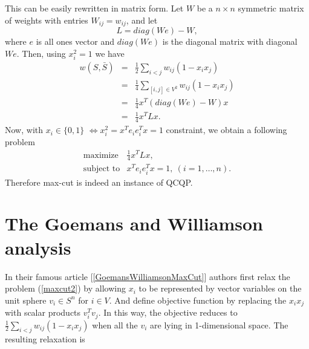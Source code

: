 \documentclass[12pt]{book}
\theoremstyle{definition}
\begin{document}
This can be easily rewritten in matrix form. Let $W$ be a $n\times n$ symmetric matrix of weights with entries $W_{ij} = w_{ij}$, and let
\begin{equation}
\label{LaplacianMatrix}
L = diag(We) - W,
\end{equation}
 where $e$ is all ones vector and $diag(We)$ is the diagonal matrix with diagonal $We$.
Then, using $x_i^2 = 1$ we have
\begin{eqnarray}
w(S,\bar{S}) & = & \frac{1}{2}\sum_{i<j}w_{ij}(1-x_ix_j )  \\
			 & = & \frac{1}{4}\sum_{[i,j]\in V^2}w_{ij}(1-x_ix_j ) \\
			 & = & \frac{1}{4}x^T(diag(We) - W)x  \\
			 & = & \frac{1}{4}x^TLx.
\end{eqnarray}
Now, with $x_i \in \{0,1\}$ $\Leftrightarrow x_i^2 = x^Te_ie_i^Tx = 1$ constraint, we obtain a following problem
\begin{equation}
\label{maxcut3}
\begin{array}{ll}
\mbox{maximize} & \frac{1}{4}x^TLx, \\
\mbox{subject to} &  x^Te_ie_i^Tx = 1, \  (i = 1,\dots ,n).
\end{array}
\end{equation}
Therefore max-cut is indeed an instance of QCQP.


\section{The Goemans and Williamson analysis}
\label{SectionGoemansAndWIlliamson}

In their famous article [\ref{GoemansWilliamsonMaxCut}] authors first relax the problem (\ref{maxcut2})
by allowing $x_i$ to be represented by vector variables on the unit sphere $v_i\in S^n$ for $i\in V$. 
And define objective function by replacing the $x_ix_j$ with scalar products $v_i^Tv_j$.
In this way, the objective reduces to $ \frac{1}{2}\sum_{i<j}w_{ij}(1-x_ix_j )$ when all the $v_i$ are lying in 1-dimensional space.
The resulting relaxation is 
 
\end{document}
